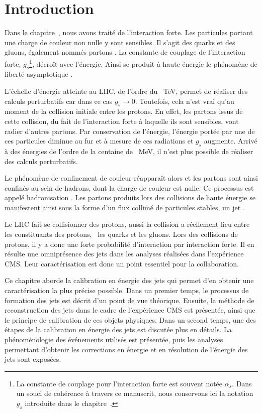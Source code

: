 \section{Introduction}\label{chapter-JERC-section-introduction}
Dans le chapitre~, nous avons traité de l'interaction forte.
Les particules portant une charge de couleur non nulle y sont sensibles.
Il s'agit des quarks et des gluons, également nommés \og partons \fg.
La constante de couplage de l'interaction forte, $g_s$\footnote{La constante de couplage pour l'interaction forte est souvent notée $\alpha_s$. Dans un souci de cohérence à travers ce manuscrit, nous conservons ici la notation $g_s$ introduite dans le chapitre~.}, décroît  avec l'énergie.
Ainsi se produit à haute énergie le phénomène de \og liberté asymptotique \fg.
\par L'échelle d'énergie atteinte au LHC, de l'ordre du \SI{}{\TeV}, permet de réaliser des calculs perturbatifs car dans ce cas $g_s \to 0$. Toutefois, cela n'est vrai qu'au moment de la collision initiale entre les protons.
En effet, les partons issus de cette collision, du fait de l'interaction forte à laquelle ils sont sensibles, vont radier d'autres partons.
Par conservation de l'énergie, l'énergie portée par une de ces particules diminue au fur et à mesure de ces radiations et $g_s$ augmente.
Arrivé à des énergies de l'ordre de la centaine de \SI{}{\MeV}, il n'est plus possible de réaliser des calculs perturbatifs.
\par Le phénomène de confinement de couleur réapparaît alors et les partons sont ainsi confinés au sein de hadrons, dont la charge de couleur est nulle.
Ce processus est appelé \og hadronisation \fg.
Les partons produits lors des collisions de haute énergie se manifestent ainsi sous la forme d'un flux collimé de particules stables, un \og jet \fg.
\par Le LHC fait se collisionner des protons, aussi la collision a réellement lieu entre les constituants des protons, \ie\ les quarks et les gluons. Lors des collisions de protons, il y a donc une forte probabilité d'interaction par interaction forte. Il en résulte une omniprésence des jets dans les analyses réalisées dans l'expérience CMS. Leur caractérisation est donc un point essentiel pour la collaboration.
\par Ce chapitre aborde la calibration en énergie des jets qui permet d'en obtenir une caractérisation la plus précise possible.
Dans un premier temps, le processus de formation des jets est décrit d'un point de vue théorique. Ensuite, la méthode de reconstruction des jets dans le cadre de l'expérience CMS est présentée, ainsi que le principe de calibration de ces objets physiques.
Dans un second temps, une des étapes de la calibration en énergie des jets est discutée plus en détails. La phénoménologie des événements utilisés est présentée, puis les analyses permettant d'obtenir les corrections en énergie et en résolution de l'énergie des jets sont exposées.